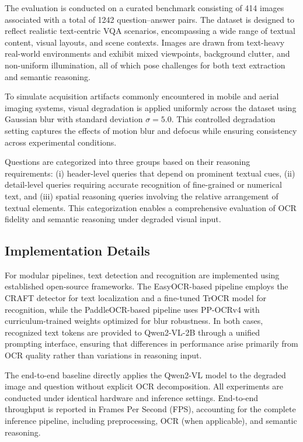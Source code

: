 \documentclass[conference]{IEEEtran}
\begin{document}
The evaluation is conducted on a curated benchmark consisting of 414 images associated with a total of 1242 question--answer pairs. The dataset is designed to reflect realistic text-centric VQA scenarios, encompassing a wide range of textual content, visual layouts, and scene contexts. Images are drawn from text-heavy real-world environments and exhibit mixed viewpoints, background clutter, and non-uniform illumination, all of which pose challenges for both text extraction and semantic reasoning.

To simulate acquisition artifacts commonly encountered in mobile and aerial imaging systems, visual degradation is applied uniformly across the dataset using Gaussian blur with standard deviation $\sigma = 5.0$. This controlled degradation setting captures the effects of motion blur and defocus while ensuring consistency across experimental conditions.

Questions are categorized into three groups based on their reasoning requirements: (i) header-level queries that depend on prominent textual cues, (ii) detail-level queries requiring accurate recognition of fine-grained or numerical text, and (iii) spatial reasoning queries involving the relative arrangement of textual elements. This categorization enables a comprehensive evaluation of OCR fidelity and semantic reasoning under degraded visual input.

\subsection{Implementation Details}

For modular pipelines, text detection and recognition are implemented using established open-source frameworks. The EasyOCR-based pipeline employs the CRAFT detector for text localization and a fine-tuned TrOCR model for recognition, while the PaddleOCR-based pipeline uses PP-OCRv4 with curriculum-trained weights optimized for blur robustness. In both cases, recognized text tokens are provided to Qwen2-VL-2B through a unified prompting interface, ensuring that differences in performance arise primarily from OCR quality rather than variations in reasoning input.

The end-to-end baseline directly applies the Qwen2-VL model to the degraded image and question without explicit OCR decomposition. All experiments are conducted under identical hardware and inference settings. End-to-end throughput is reported in Frames Per Second (FPS), accounting for the complete inference pipeline, including preprocessing, OCR (when applicable), and semantic reasoning.
\end{document}
